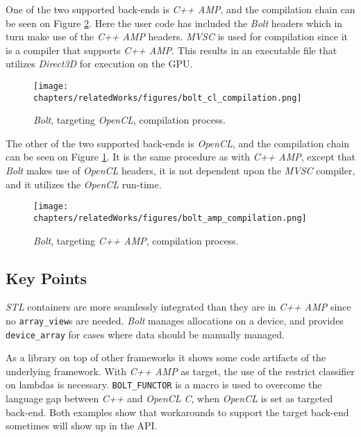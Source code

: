 One of the two supported back-ends is \textit{C++ AMP}, and the compilation chain can be seen on Figure \ref{fig:boltAmpCompilation}. Here the user code has included the \textit{Bolt} headers which in turn make use of the \textit{C++ AMP} headers. \textit{MVSC} is used for compilation since it is a compiler that supports \textit{C++ AMP}. This results in an executable file that utilizes \textit{Direct3D} for execution on the GPU.

\begin{figure}[H]
\center
\texttt{[image: chapters/relatedWorks/figures/bolt\_cl\_compilation.png]}
\caption{\textit{Bolt}, targeting \textit{OpenCL}, compilation process.}
\label{fig:boltClCompilation}
\end{figure}

The other of the two supported back-ends is \textit{OpenCL}, and the compilation chain can be seen on Figure \ref{fig:boltClCompilation}. It is the same procedure as with \textit{C++ AMP}, except that \textit{Bolt} makes use of \textit{OpenCL} headers, it is not dependent upon the \textit{MVSC} compiler, and it utilizes the \textit{OpenCL} run-time.

\begin{figure}
\center
\texttt{[image: chapters/relatedWorks/figures/bolt\_amp\_compilation.png]}
\caption{\textit{Bolt}, targeting \textit{C++ AMP}, compilation process.}
\label{fig:boltAmpCompilation}
\end{figure}

\subsection{Key Points}
\textit{STL} containers are more seamlessly integrated than they are in \textit{C++ AMP} since no \texttt{array\_view}s are needed. \textit{Bolt} manages allocations on a device, and provides \texttt{device\_array} for cases where data should be manually managed.

As a library on top of other frameworks it shows some code artifacts of the underlying framework. With \textit{C++ AMP} as target, the use of the restrict classifier on lambdas is necessary. \texttt{BOLT\_FUNCTOR} is a macro is used to overcome the language gap between \textit{C++} and \textit{OpenCL C}, when \textit{OpenCL} is set as targeted back-end. Both examples show that workarounds to support the target back-end sometimes will show up in the API. 